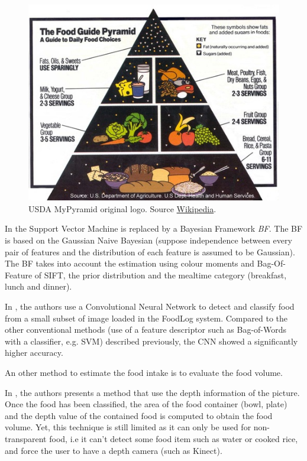 \begin{figure}
    \centering
    \includegraphics[scale=0.7]{img/my_pyramid.jpg}
    \caption[USDA MyPyramid original logo]{USDA MyPyramid original logo. Source \href{https://en.wikipedia.org/wiki/Food_pyramid_(nutrition)}{Wikipedia}.}
    \label{fig:my_pyramid}
\end{figure}

In \cite{Aizawa2013} the Support Vector Machine is replaced by a Bayesian Framework \textit{BF}.
The BF is based on the Gaussian Naive Bayesian (suppose independence between every pair of features and the distribution of each feature is assumed to be Gaussian). The BF takes into account the estimation using colour moments and Bag-Of-Feature of SIFT, the prior distribution and the mealtime category (breakfast, lunch and dinner).

In \cite{Kagaya2014}, the authors use a Convolutional Neural Network  to detect and classify food from a small subset of image loaded in the FoodLog system. Compared to the other conventional methods (use of a feature descriptor such as Bag-of-Words with a classifier, e.g. SVM) described previously, the CNN showed a significantly higher accuracy.


An other method to estimate the food intake is to evaluate the food volume.

In \cite{Chen2012}, the authors presents a method that use the depth information of the picture. Once the food has been classified, the area of the food container (bowl, plate) and the depth value of the contained food is computed to obtain the food volume.
Yet, this technique is still limited as it can only be used for non-transparent food, i.e it can't detect some food item such as water or cooked rice, and force the user to have a depth camera (such as Kinect).

